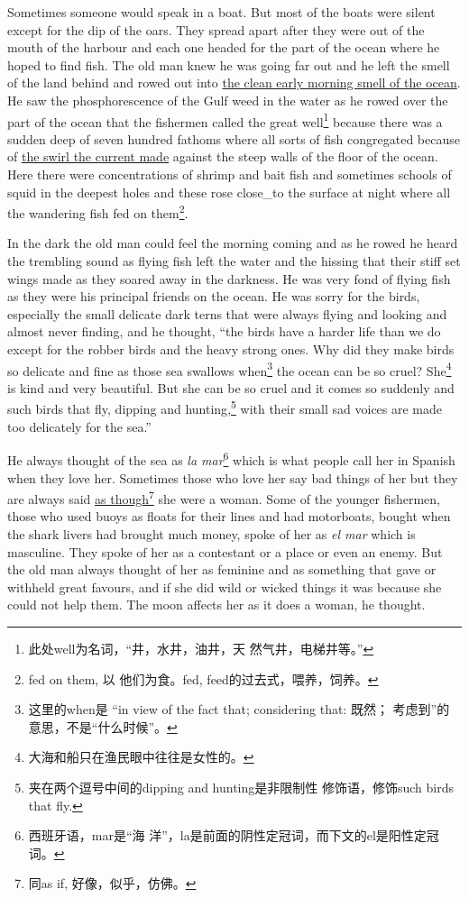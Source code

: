 \documentclass[fontset=ubuntu,zihao=-4]{ctexrep}
\begin{document}
Sometimes someone would speak in a boat. But most of the boats were silent
except for the \gls{dip} of the oars. They spread \gls{apart} after they
were out of the mouth of the harbour and each one headed for the part of the
ocean where he hoped to find fish. The old man knew he was going far out and
he left the smell of the land behind and rowed out into \uline{the clean
  early morning smell of the ocean}. He saw the \gls{phosphorescence} of the
Gulf weed in the water as he rowed over the part of the ocean that the
fishermen called the great well\footnote{此处well为名词，“井，水井，油井，天
  然气井，电梯井等。”} because there was a \gls{sudden} deep of seven
hundred \glspl{fathom} where all sorts of fish \gls{congregated} because of
\uline{the \gls{swirl} the current made} against the \gls{steep} walls of
the floor of the ocean. Here there were \glspl{concentration} of
\gls{shrimp} and bait fish and sometimes \glspl{school} of \gls{squid} in
the deepest holes and these \gls{rose} \gls{close_to} the \gls{surface} at
night where all the \gls{wandering} fish fed on them\footnote{fed on them, 以
  他们为食。fed, feed的过去式，喂养，饲养。}.

In the dark the old man could feel the morning coming and as he rowed he
heard the \gls{trembling} sound as flying fish left the water and the
\gls{hissing} that their \gls{stiff} set \glspl{wing} made as they \gls{soared}
away in the darkness. He was very \gls{fond} of flying fish as they were his
\gls{principal} friends on the ocean. He was \gls{sorry} for the birds,
especially the small \gls{delicate} dark \glspl{tern} that were always flying and
looking and almost never finding, and he thought, ``the birds have a harder
life than we do except for the \gls{robber} birds and the heavy strong ones.
Why did they make birds so delicate and fine as those sea \glspl{swallow}
when\footnote{这里的when是 “in view of the fact that; considering that: 既然；
  考虑到”的意思，不是“什么时候”。} the ocean can be so \gls{cruel}?
She\footnote{大海和船只在渔民眼中往往是女性的。} is kind and very beautiful.
But she can be so cruel and it comes so suddenly and such birds that fly,
dipping and \gls{hunting},\footnote{夹在两个逗号中间的dipping and hunting是非限制性
  修饰语，修饰such birds that fly.} with their small sad voices are made too
\gls{delicately} for the sea.''

He always thought of the sea as \emph{la mar}\footnote{西班牙语，mar是“海
  洋”，la是前面的阴性定冠词，而下文的el是阳性定冠词。} which is what people
call her in Spanish when they love her. Sometimes those who love her say bad
things of her but they are always said \uline{as though}\footnote{同as if,
  好像，似乎，仿佛。} she were a woman. Some of
the younger fishermen, those who used \glspl{buoy} as \glspl{float} for
their lines and had motorboats, bought when the shark livers had brought
much money, spoke of her as \emph{el mar} which is \gls{masculine}. They
spoke of her as a \gls{contestant} or a place or even an \gls{enemy}. But
the old man always thought of her as \gls{feminine} and as something that
gave or \gls{withheld} great \glspl{favour}, and if she did wild or
\gls{wicked} things it was because she could not help them. The moon
\glspl{affect} her as it does a woman, he thought.
\end{document}
